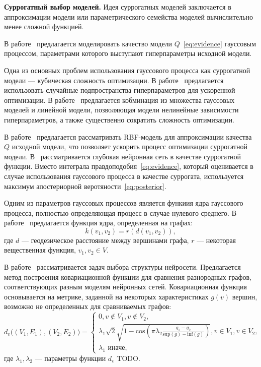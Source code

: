 \textbf{Суррогатный выбор моделей. }
Идея суррогатных моделей заключается в аппроксимации модели или параметрического семейства моделей вычислительно менее сложной функцией.

В работе~\cite{bo_gp} предлагается моделировать качество модели $Q$~\eqref{eq:evidence} гауссовым процессом, параметрами которого выступают гиперпараметры исходной модели.

Одна из основных проблем использования гауссового процесса как суррогатной модели --- кубическая сложность оптимизации. В работе~\cite{random_gaus} предлагается использовать случайные подпространства гиперпараметров для ускоренной оптимизации.  В работе~\cite{gp_tree} предлагается кобминация из множества гауссовых моделей и линейной модели, позволяющая модели нелинейные зависимости гиперпараметров, а также существенно сократить сложность оптимизации. 

В работе~\cite{rbf_surrogate} предлагается рассматривать RBF-модель для аппроксимации качества $Q$ исходной модели, что позволяет ускорить процесс оптимизации суррогатной модели. В~\cite{snoek_deep} рассматривается глубокая нейронная сеть в качестве суррогатной функции. Вместо интеграла правдоподобия~\eqref{eq:evidence}, который оценивается в случае использования гауссового процесса в качестве суррогата, используется максимум апостериорной веротяности~\eqref{eq:posterior}.

Одним из параметров гауссовых процессов является функиия ядра гауссового процесса, полностью определяющая процесс в случае нулевого среднего. В работе~\cite{gp_fusion} предлагается функция ядра, определенная на графах:
    \[
    k(v_1,v_2) = r(d(v_1,v_2)),
    \]
где $d$ --- геодезическое расстояние между вершинами графа, $r$ --- некоторая вещественная функция, $v_1, v_2 \in V$.

В работе~\cite{gp_arc} рассматривается задач выбора структуры нейросети. Предлагается метод построения ковариационной функции для сравнения разнородных графов, соответствующих разным моделям нейронных сетей. Ковариационная функция основывается на метрике, заданной на некоторых характеристиках $g(v)$ вершин, возможно не определенных для сравниваемых графов:
\[
    d_v\bigl( (V_1, E_1), (V_2,E_2) \bigr) = \begin{cases}
    0, v \not \in V_1, v \not \in V_2,\\    
    \lambda_1\sqrt{2}\sqrt{1- \text{cos}(\pi\lambda_2\frac{g_1 - g_2}{\text{sup}(g) - \text{inf}(g) })}, v \in V_1, v \in V_2,\\
    \lambda_1 \text{ иначе,}
    \end{cases}
\]
где $\lambda_1, \lambda_2$ --- параметры функции $d_v$ TODO.

